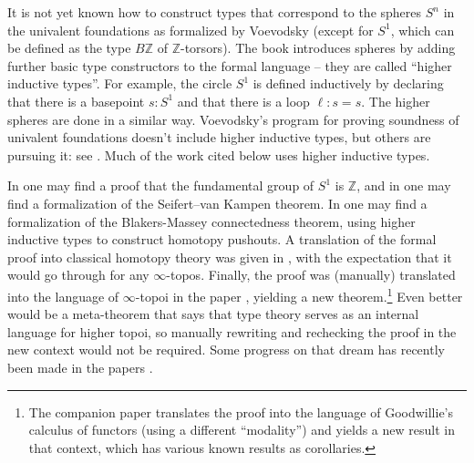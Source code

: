 \documentclass[letter,12pt]{amsart}
\theoremstyle{definition}
\theoremstyle{remark}
\numberwithin{equation}{section}
\newcommand{\ZZ}{\mathbb{Z}}
\begin{document}
It is not yet known how to construct types that correspond to the spheres $S^n$ in the univalent foundations as formalized by Voevodsky (except for $S^1$, which can be
defined as the type $B\ZZ$ of $\ZZ$-torsors).  The book \citep{hottbook} introduces spheres by adding further basic type constructors to the
formal language -- they are called ``higher inductive types''.  For example, the circle $S^1$ is defined inductively by declaring that there is
a basepoint $s : S^1$ and that there is a loop $\ell : s = s$.  The higher spheres are done in a similar way.  Voevodsky's program for proving
soundness of univalent foundations doesn't include higher inductive types, but others are pursuing it: see \citep{1705.07088}.  Much of the work
cited below uses higher inductive types.

In \citep{MR3323808} one may find a proof that the fundamental group of $S^1$ is $\ZZ$, and in \citep{MR3566711} one may find a formalization of
the Seifert--van Kampen theorem.
In \citep{1605.03227} one may find a formalization of the Blakers-Massey connectedness theorem, using higher inductive types to construct
homotopy pushouts.  A translation of the formal proof into classical homotopy theory was given in \citep{RezkBM}, with the expectation that it
would go through for any $\infty$-topos.  Finally, the proof was (manually) translated into the language of $\infty$-topoi in the paper \citep{1703.09050},
yielding a new theorem.\footnote{The companion paper \citep{1703.09632} translates the proof into the language of Goodwillie's calculus of
  functors (using a different ``modality'') and yields a new result in that context, which has various known results as corollaries.}
Even better would be a meta-theorem that says that type theory serves as an internal language for higher topoi, so manually rewriting and
rechecking the proof in the new context would not be required.  Some progress on that dream has recently been made in the papers \citep{1610.00037,1709.09519}.
\end{document}
